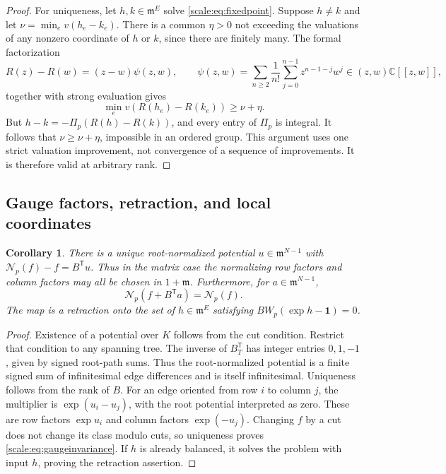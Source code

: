 \documentclass[11pt,a4paper]{article}
\numberwithin{equation}{section}
\newtheorem{corollary}[theorem]{Corollary}
\theoremstyle{definition}
\newcommand{\C}{\mathbb C}
\newcommand{\mm}{\mathfrak m}
\newcommand{\NN}{\mathcal N}
\begin{document}
\begin{proof}
For uniqueness, let $h,k\in\mm^E$ solve \eqref{scale:eq:fixedpoint}.
Suppose $h\ne k$ and let $\nu=\min_e v(h_e-k_e)$.
There is a common $\eta>0$ not exceeding the valuations of any
nonzero coordinate of $h$ or $k$, since there are finitely many.
The formal factorization
\[
 R(z)-R(w)=(z-w)\psi(z,w),\qquad
 \psi(z,w)=\sum_{n\geq2}\frac1{n!}
     \sum_{j=0}^{n-1}z^{n-1-j}w^j\in(z,w)\C[[z,w]],
\]
together with strong evaluation gives
\[
 \min_e v(R(h_e)-R(k_e))\geq\nu+\eta.
\]
But $h-k=-\Pi_p(R(h)-R(k))$, and every entry of $\Pi_p$ is integral.
It follows that $\nu\geq\nu+\eta$, impossible in an ordered group.
This argument uses one strict valuation improvement, not convergence
of a sequence of improvements. It is therefore valid at arbitrary
rank.
\end{proof}

\subsection{Gauge factors, retraction, and local coordinates}
\begin{corollary}\label{scale:cor:gauge}
There is a unique root-normalized potential $u\in\mm^{N-1}$ with
$\NN_p(f)-f=B^{\mathsf T}u$. Thus in the matrix case the normalizing
row factors and column factors may all be chosen in $1+\mm$.
Furthermore, for $a\in\mm^{N-1}$,
\begin{equation}\label{scale:eq:gaugeinvariance}
 \NN_p(f+B^{\mathsf T}a)=\NN_p(f).
\end{equation}
The map is a retraction onto the set of $h\in\mm^E$ satisfying
$BW_p(\exp h-\mathbf1)=0$.
\end{corollary}
\begin{proof}
Existence of a potential over $K$ follows from the cut condition.
Restrict that condition to any spanning tree. The inverse of
$B_T^{\mathsf T}$ has integer entries $0,1,-1$, given by signed
root-path sums. Thus the root-normalized
potential is a finite signed sum of infinitesimal edge differences
and is itself infinitesimal. Uniqueness follows from the rank of $B$.
For an edge oriented from row $i$ to column $j$, the multiplier is
$\exp(u_i-u_j)$, with the root potential interpreted as zero.
These are row factors $\exp u_i$ and column factors $\exp(-u_j)$.
Changing $f$ by a cut does not change its class modulo cuts, so
uniqueness proves \eqref{scale:eq:gaugeinvariance}. If $h$ is already
balanced, it solves the problem with input $h$, proving the retraction
assertion.
\end{proof}
\end{document}
